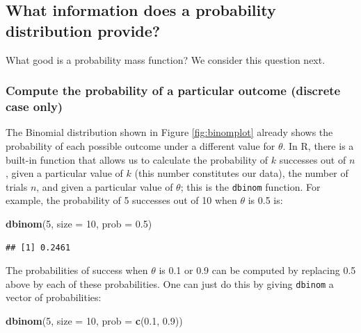 \documentclass[12pt,]{krantz}
\newenvironment{Shaded}{\begin{snugshade}}{\end{snugshade}}
\newcommand{\DataTypeTok}[1]{\textcolor[rgb]{0.13,0.29,0.53}{#1}}
\newcommand{\DecValTok}[1]{\textcolor[rgb]{0.00,0.00,0.81}{#1}}
\newcommand{\FloatTok}[1]{\textcolor[rgb]{0.00,0.00,0.81}{#1}}
\newcommand{\KeywordTok}[1]{\textcolor[rgb]{0.13,0.29,0.53}{\textbf{#1}}}
\newcommand{\NormalTok}[1]{#1}
\begin{document}
\hypertarget{what-information-does-a-probability-distribution-provide}{%
\subsection{What information does a probability distribution provide?}\label{what-information-does-a-probability-distribution-provide}}

What good is a probability mass function? We consider this question next.

\hypertarget{compute-the-probability-of-a-particular-outcome-discrete-case-only}{%
\subsubsection{Compute the probability of a particular outcome (discrete case only)}\label{compute-the-probability-of-a-particular-outcome-discrete-case-only}}

The Binomial distribution shown in Figure \ref{fig:binomplot} already shows the probability of each possible outcome under a different value for \(\theta\). In R, there is a built-in function that allows us to calculate the probability of \(k\) successes out of \(n\), given a particular value of \(k\) (this number constitutes our data), the number of trials \(n\), and given a particular value of \(\theta\); this is the \texttt{dbinom} function. For example, the probability of 5 successes out of 10 when \(\theta\) is 0.5 is:

\begin{Shaded}
\begin{Highlighting}[]
\KeywordTok{dbinom}\NormalTok{(}\DecValTok{5}\NormalTok{, }\DataTypeTok{size =} \DecValTok{10}\NormalTok{, }\DataTypeTok{prob =} \FloatTok{0.5}\NormalTok{)}
\end{Highlighting}
\end{Shaded}

\begin{verbatim}
## [1] 0.2461
\end{verbatim}

The probabilities of success when \(\theta\) is 0.1 or 0.9 can be computed by replacing 0.5 above by each of these probabilities. One can just do this by giving \texttt{dbinom} a vector of probabilities:

\begin{Shaded}
\begin{Highlighting}[]
\KeywordTok{dbinom}\NormalTok{(}\DecValTok{5}\NormalTok{, }\DataTypeTok{size =} \DecValTok{10}\NormalTok{, }\DataTypeTok{prob =} \KeywordTok{c}\NormalTok{(}\FloatTok{0.1}\NormalTok{, }\FloatTok{0.9}\NormalTok{))}
\end{Highlighting}
\end{Shaded}
\end{document}
